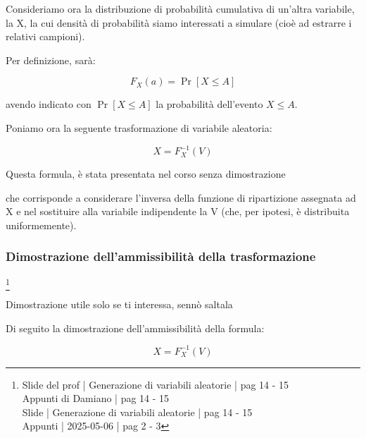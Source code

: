 Consideriamo ora la distribuzione di probabilità cumulativa di un'altra variabile, 
la X, la cui densità di probabilità siamo interessati a simulare (cioè ad estrarre i relativi campioni). \newline 

Per definizione, sarà: 

{
    \Large 
    \begin{equation}
        F_X (a)
        = 
        \Pr \left[X \le A\right]
    \end{equation}
}

avendo indicato con $\Pr \left[X \le A\right]$ la probabilità dell'evento $X \le A$. \newline 

Poniamo ora la seguente trasformazione di variabile aleatoria: 

{
    \Large 
    \begin{equation}
        X = F_X^{-1} (V)
    \end{equation}
}

\begin{tcolorbox}
    Questa formula, è stata presentata nel corso senza dimostrazione
\end{tcolorbox}

che corrisponde a considerare l'inversa della funzione di ripartizione assegnata ad X e nel sostituire alla variabile indipendente la V 
(che, per ipotesi, è distribuita uniformemente). \newline 

\newpage 

\subsubsection{Dimostrazione dell'ammissibilità della trasformazione}
\footnote{Slide del prof | Generazione di variabili aleatorie | pag 14 - 15\\
Appunti di Damiano | pag 14 - 15\\ 
Slide | Generazione di variabili aleatorie | pag  14 - 15\\ 
Appunti | 2025-05-06 | pag 2 - 3
} 

\begin{tcolorbox}
    Dimostrazione utile solo se ti interessa, sennò saltala
\end{tcolorbox}

Di seguito la dimostrazione dell'ammissibilità della formula: 

{
    \Large 
    \begin{equation}
        X = F_X^{-1} (V)
    \end{equation}
}

